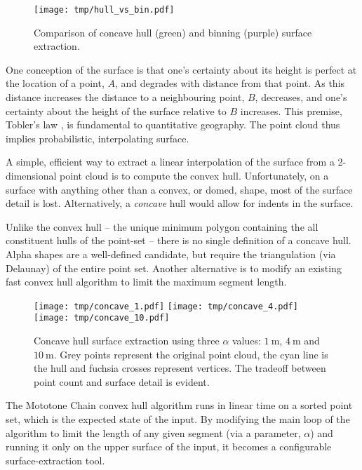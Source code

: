 \documentclass[doc]{apa6}
\begin{document}
\begin{wrapfigure}{r}{0.5\textwidth} %
\begin{center}
\texttt{[image: tmp/hull\_vs\_bin.pdf]} 
\end{center}
\caption{Comparison of concave hull (green) and binning (purple) surface extraction.}
\label{fig:bin_vs_hull}
\end{wrapfigure}

One conception of the surface is that one's  certainty about its height is perfect at the location of a point, $A$, and degrades with distance from that point. As this distance increases the distance to a neighbouring point, $B$, decreases, and one's certainty about the height of the surface relative to $B$ increases. This premise, Tobler's law \parencite{Tobler1970a}, is fundamental to quantitative geography. The point cloud thus implies probabilistic, interpolating surface. 

A simple, efficient way to extract a linear interpolation of the surface from a 2-dimensional point cloud is to compute the convex hull. Unfortunately, on a surface  with anything other than a convex, or domed, shape, most of the surface detail is lost. Alternatively, a \emph{concave} hull would allow for indents in the surface. 

Unlike the convex hull -- the unique minimum polygon containing the all constituent hulls of the point-set -- there is no single definition of a concave hull. Alpha shapes \parencite{Edelsbrunner1994} are a well-defined candidate, but require the triangulation (via Delaunay) of the entire point set. Another alternative is to modify an existing fast convex hull algorithm to limit the maximum segment length.

\begin{figure} %
\texttt{[image: tmp/concave\_1.pdf]} 
\texttt{[image: tmp/concave\_4.pdf]} 
\texttt{[image: tmp/concave\_10.pdf]} 
\caption{Concave hull surface extraction using three $\alpha$ values: $\SI{1}\m$, $\SI{4}\m$ and $\SI{10}\m$. Grey points represent the original point cloud, the cyan line is the hull and fuchsia crosses represent vertices. The tradeoff between point count and surface detail is evident.}
\label{fig:concave}
\end{figure}

The Mototone Chain convex hull algorithm \parencite{Andrew1979} runs in linear time on a sorted point set, which is the expected state of the input. By modifying the main loop of the algorithm to limit the length of any given segment (via a parameter, $\alpha$) and running it only on the upper surface of the input, it becomes a configurable surface-extraction tool. 
\end{document}
